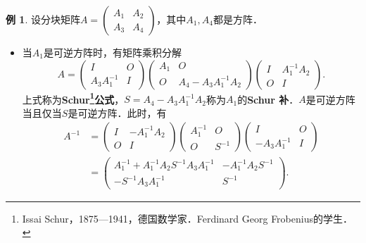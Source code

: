 \documentclass[a4paper,fontset=windows]{ctexbook}
\theoremstyle{definition}
\newtheorem{example}{例}[chapter]
\begin{document}
\begin{example}
设分块矩阵$A=\begin{pmatrix}A_1&A_2 \\ A_3&A_4\end{pmatrix}$，其中$A_1,A_4$都是方阵．
\begin{itemize}
\item 当$A_1$是可逆方阵时，有矩阵乘积分解
$$A=\begin{pmatrix}I&O \\ A_3A_1^{-1}&I\end{pmatrix}\begin{pmatrix}A_1&O \\ O&A_4-A_3A_1^{-1}A_2\end{pmatrix}\begin{pmatrix}I&A_1^{-1}A_2 \\ O&I\end{pmatrix}.$$
上式称为{\bf Schur\footnote{Issai Schur，1875—1941，德国数学家．Ferdinard Georg Frobenius的学生．}公式}，$S=A_4-A_3A_1^{-1}A_2$称为$A_1$的{\bf Schur 补}．$A$是可逆方阵当且仅当$S$是可逆方阵．此时，有
\begin{align*}
A^{-1}&=\begin{pmatrix}I&-A_1^{-1}A_2 \\ O&I\end{pmatrix}\begin{pmatrix}A_1^{-1}&O \\ O&S^{-1}\end{pmatrix}\begin{pmatrix}I&O \\ -A_3A_1^{-1}&I\end{pmatrix} \\
&=\begin{pmatrix}A_1^{-1}+A_1^{-1}A_2S^{-1}A_3A_1^{-1}&-A_1^{-1}A_2S^{-1} \\ -S^{-1}A_3A_1^{-1}&S^{-1}\end{pmatrix}.
\end{align*}


\end{itemize}
\end{example}
\end{document}
